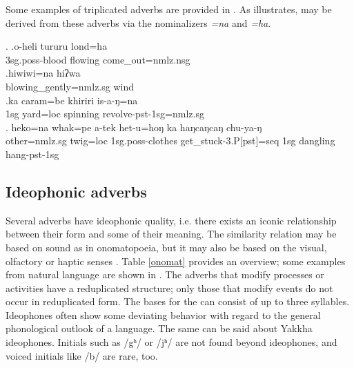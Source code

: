 Some examples of triplicated adverbs are provided in \Next. As \Next[b] illustrates,  may be derived from these adverbs via the nominalizers \emph{=na} and \emph{=ha}.  

 \ex. \ag.o-heli tururu lond=ha\\	
	{\sc 3sg.poss}-blood flowing	come\_out{\sc [pst]=nmlz.nsg}	\\
	 \bg.hiwiwi=na hiʔwa\\
	blowing\_gently{\sc =nmlz.sg}	wind\\
	 \bg.ka caram=be khiriri is-a-ŋ=na \\
		{\sc 1sg}	yard{\sc =loc} spinning 	revolve{\sc -pst-1sg=nmlz.sg}\\
	 \bg. heko=na         whak=pe      a-tek              het-u=hoŋ              ka  haŋcaŋcaŋ chu-ya-ŋ\\
	other{\sc =nmlz.sg} twig{\sc =loc} {\sc 1sg.poss-}clothes get\_stuck{\sc -3.P[pst]=seq} {\sc 1sg} dangling hang{\sc -pst-1sg}\\
	  
	
\subsection{Ideophonic adverbs}\label{sec-ideophone}

Several adverbs have ideophonic quality, i.e. there exists an iconic relationship between their form and some  of their meaning. The similarity relation may be based on sound as in onomatopoeia, but it may also be based on the visual, olfactory or haptic senses \citep{Caughley1997_Vowel}. Table \ref{onomat} provides an overview; some examples from natural language are shown in  \Next. The adverbs that modify processes or activities have a reduplicated structure; only those that modify  events do not occur in reduplicated form. The bases for the  can consist of up to three syllables. Ideophones often show some deviating behavior with regard to the general phonological outlook of a language. The same can be said about Yakkha ideophones. Initials such as /gʰ/ or /jʰ/ are not found beyond ideophones, and voiced initials like /b/ are rare, too.


